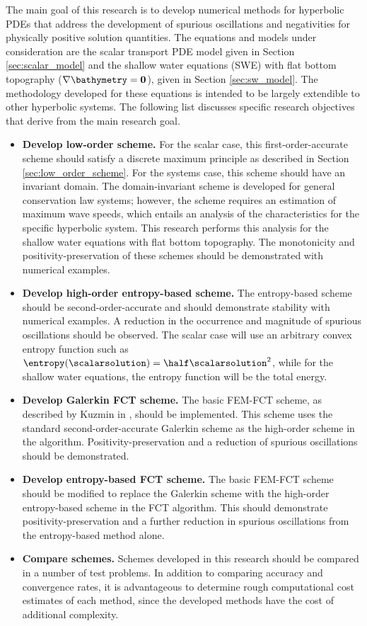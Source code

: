The main goal of this research is to develop numerical methods for hyperbolic
PDEs that address the development of spurious oscillations and negativities for
physically positive solution quantities. The equations and models under
consideration are the scalar transport PDE model given in Section
\ref{sec:scalar_model} and the shallow water equations (SWE) with flat bottom
topography ($\nabla\bathymetry=\mathbf{0}$), given in Section
\ref{sec:sw_model}.  The methodology developed for these equations is intended
to be largely extendible to other hyperbolic systems. The following list
discusses specific research objectives that derive from the main research goal.

\begin{itemize}
  \item \textbf{Develop low-order scheme.}
    For the scalar case, this first-order-accurate scheme should satisfy a discrete maximum principle
    as described in Section \ref{sec:low_order_scheme}. For the systems case,
    this scheme should have an invariant domain. The domain-invariant scheme
    is developed for general conservation law systems; however, the scheme
    requires an estimation of maximum wave speeds, which entails an
    analysis of the characteristics for the specific hyperbolic system. This
    research performs this analysis for the shallow water equations with flat
    bottom topography. The monotonicity and
    positivity-preservation of these schemes should be demonstrated with numerical examples.
  \item \textbf{Develop high-order entropy-based scheme.}
    The entropy-based scheme should be second-order-accurate and should
    demonstrate stability with numerical examples. A reduction in the occurrence
    and magnitude of spurious oscillations should be observed. The scalar
    case will use an arbitrary convex entropy function such as
    $\entropy(\scalarsolution)=\half\scalarsolution^2$, while for the shallow
    water equations, the entropy function will be the total energy.
  \item \textbf{Develop Galerkin FCT scheme.}
    The basic FEM-FCT scheme, as described by Kuzmin in \cite{kuzmin_FCT}, should
    be implemented. This scheme uses the standard second-order-accurate Galerkin
    scheme as the high-order scheme in the algorithm. Positivity-preservation and
    a reduction of spurious oscillations should be demonstrated.
  \item \textbf{Develop entropy-based FCT scheme.}
    The basic FEM-FCT scheme should be modified to replace the Galerkin scheme
    with the high-order entropy-based scheme in the FCT algorithm. This should
    demonstrate positivity-preservation and a further reduction in spurious
    oscillations from the entropy-based method alone.
  \item \textbf{Compare schemes.}
    Schemes developed in this research should be compared in a number of
    test problems. In addition to comparing accuracy and convergence rates,
    it is advantageous to determine rough computational cost estimates
    of each method, since the developed methods have the cost of additional
    complexity.
\end{itemize}

